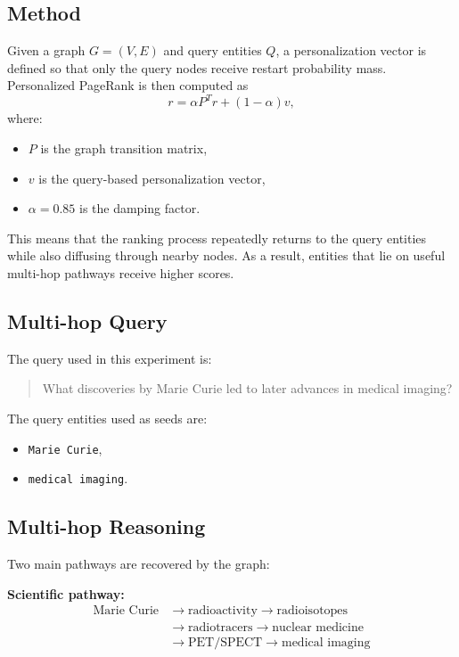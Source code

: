 \documentclass[12pt]{article}
\begin{document}
\subsection{Method}

Given a graph $G=(V,E)$ and query entities $Q$, a personalization vector is defined so that only the query nodes receive restart probability mass. Personalized PageRank is then computed as
\[
r = \alpha P^T r + (1-\alpha)v,
\]
where:
\begin{itemize}
    \item $P$ is the graph transition matrix,
    \item $v$ is the query-based personalization vector,
    \item $\alpha = 0.85$ is the damping factor.
\end{itemize}

This means that the ranking process repeatedly returns to the query entities while also diffusing through nearby nodes. As a result, entities that lie on useful multi-hop pathways receive higher scores.

\subsection{Multi-hop Query}

The query used in this experiment is:

\begin{quote}
What discoveries by Marie Curie led to later advances in medical imaging?
\end{quote}

The query entities used as seeds are:
\begin{itemize}
    \item \texttt{Marie Curie},
    \item \texttt{medical imaging}.
\end{itemize}

\subsection{Multi-hop Reasoning}

Two main pathways are recovered by the graph:

\textbf{Scientific pathway:}
\[
\begin{aligned}
\text{Marie Curie} &\rightarrow \text{radioactivity} \rightarrow \text{radioisotopes} \\
&\rightarrow \text{radiotracers} \rightarrow \text{nuclear medicine} \\
&\rightarrow \text{PET/SPECT} \rightarrow \text{medical imaging}
\end{aligned}
\]
\end{document}
